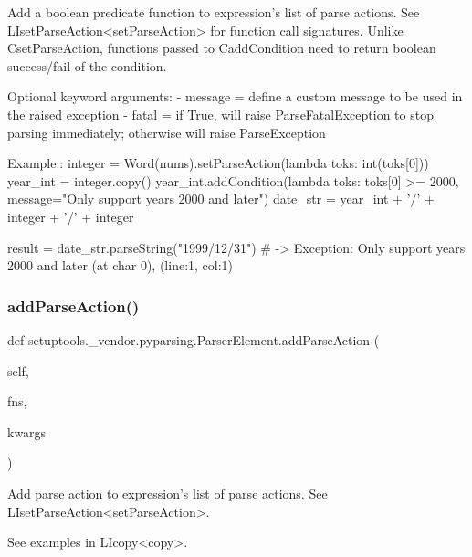 \begin{DoxyVerb}Add a boolean predicate function to expression's list of parse actions. See 
L{I{setParseAction}<setParseAction>} for function call signatures. Unlike C{setParseAction}, 
functions passed to C{addCondition} need to return boolean success/fail of the condition.

Optional keyword arguments:
 - message = define a custom message to be used in the raised exception
 - fatal   = if True, will raise ParseFatalException to stop parsing immediately; otherwise will raise ParseException
 
Example::
    integer = Word(nums).setParseAction(lambda toks: int(toks[0]))
    year_int = integer.copy()
    year_int.addCondition(lambda toks: toks[0] >= 2000, message="Only support years 2000 and later")
    date_str = year_int + '/' + integer + '/' + integer

    result = date_str.parseString("1999/12/31")  # -> Exception: Only support years 2000 and later (at char 0), (line:1, col:1)
\end{DoxyVerb}
 \mbox{\label{classsetuptools_1_1__vendor_1_1pyparsing_1_1_parser_element_a350ff60fb199c182d996530bc63166f5}} 
\subsubsection{\texorpdfstring{add\+Parse\+Action()}{addParseAction()}}
{\footnotesize\ttfamily def setuptools.\+\_\+vendor.\+pyparsing.\+Parser\+Element.\+add\+Parse\+Action (\begin{DoxyParamCaption}\item[{}]{self,  }\item[{}]{fns,  }\item[{}]{kwargs }\end{DoxyParamCaption})}

\begin{DoxyVerb}Add parse action to expression's list of parse actions. See L{I{setParseAction}<setParseAction>}.

See examples in L{I{copy}<copy>}.
\end{DoxyVerb}
 \mbox{\label{classsetuptools_1_1__vendor_1_1pyparsing_1_1_parser_element_a8bb074071dc9fc5f473a5e93459b8ddb}} 
